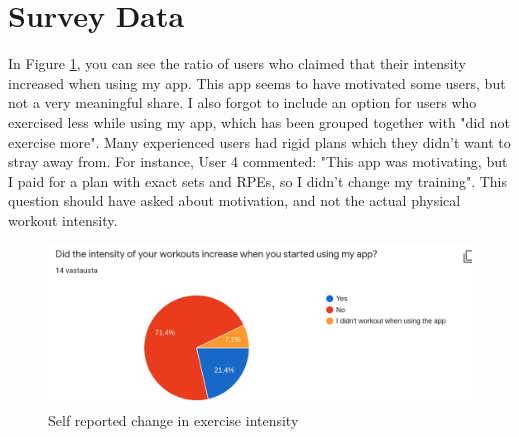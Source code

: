 \documentclass{l4proj}
\begin{document}
\section{Survey Data}
In Figure \ref{fig:intensity}, you can see the ratio of users who claimed that their intensity increased when using my app. This app seems to have motivated some users, but not a very meaningful share. I also forgot to include an option for users who exercised less while using my app, which has been grouped together with "did not exercise more". Many experienced users had rigid plans which they didn't want to stray away from. For instance, User 4 commented: "This app was motivating, but I paid for a plan with exact sets and RPEs, so I didn't change my training". This question should have asked about motivation, and not the actual physical workout intensity.
\begin{figure}[H]
    \centering
    \includegraphics[width=1.0\linewidth]{exercise_intensity.png}    
    \caption{Self reported change in exercise intensity}
    \label{fig:intensity} 
\end{figure}
\end{document}
